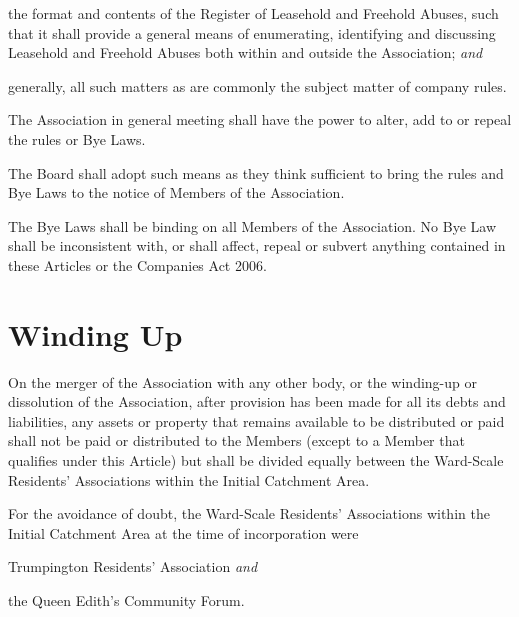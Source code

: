 \documentclass[12pt]{article}
\newcommand{\EC}[0]{Board}
\newcommand{\Exec}[0]{\EC{} }
\newcommand{\WSRA}[0]{Ward-Scale Residents' Association}
\newcommand{\LAFA}[0]{Leasehold and Freehold Abuses}
\newcommand{\ITand}[0]{\textit{and}}
\begin{document}
\begin{constenum}
\begin{constenum}
\item the format and contents of the Register of \LAFA, such that
  it shall provide a general means of enumerating, identifying and
  discussing \LAFA{} both within and outside the Association; \ITand

\item generally, all such matters as are commonly the subject matter
  of company rules.

\end{constenum}

\item The Association in general meeting shall have the power to
  alter, add to or repeal the rules or Bye Laws.

\item The \Exec shall adopt such means as they think sufficient to
  bring the rules and Bye Laws to the notice of Members of the Association.

\item The Bye Laws shall be binding on all Members of the
  Association. No Bye Law shall be inconsistent with, or shall
  affect, repeal or subvert anything contained in these Articles or
  the Companies Act 2006.
\end{constenum}


\section{Winding Up}

\begin{constenum}

\item On the merger of the Association with any other body, or the
  winding-up or dissolution of the Association, after provision has
  been made for all its debts and liabilities, any assets or property
  that remains available to be distributed or paid shall not be paid
  or distributed to the Members (except to a Member that qualifies
  under this Article) but shall be divided equally between the
  \WSRA{}s within the Initial Catchment Area.

\item For the avoidance of doubt, the \WSRA{}s within the Initial
  Catchment Area at the time of incorporation were
  \begin{constenum}
    \item Trumpington Residents' Association \ITand
    \item the Queen Edith's Community Forum.
  \end{constenum}

\end{constenum}
\end{document}
